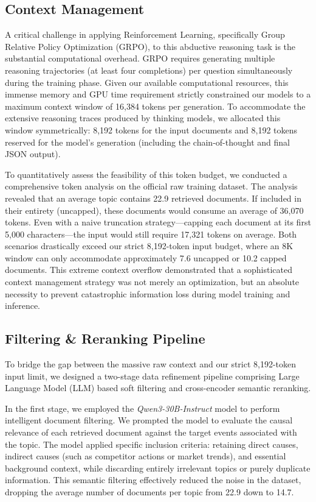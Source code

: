 \documentclass{article}
\begin{document}
\subsection{Context Management}

A critical challenge in applying Reinforcement Learning, specifically Group Relative Policy Optimization (GRPO), to this abductive reasoning task is the substantial computational overhead. GRPO requires generating multiple reasoning trajectories (at least four completions) per question simultaneously during the training phase. Given our available computational resources, this immense memory and GPU time requirement strictly constrained our models to a maximum context window of 16,384 tokens per generation. To accommodate the extensive reasoning traces produced by thinking models, we allocated this window symmetrically: 8,192 tokens for the input documents and 8,192 tokens reserved for the model's generation (including the chain-of-thought and final JSON output).

To quantitatively assess the feasibility of this token budget, we conducted a comprehensive token analysis on the official raw training dataset. The analysis revealed that an average topic contains 22.9 retrieved documents. If included in their entirety (uncapped), these documents would consume an average of 36,070 tokens. Even with a naive truncation strategy—capping each document at its first 5,000 characters—the input would still require 17,321 tokens on average. Both scenarios drastically exceed our strict 8,192-token input budget, where an 8K window can only accommodate approximately 7.6 uncapped or 10.2 capped documents. This extreme context overflow demonstrated that a sophisticated context management strategy was not merely an optimization, but an absolute necessity to prevent catastrophic information loss during model training and inference.

\subsection{Filtering \& Reranking Pipeline}

To bridge the gap between the massive raw context and our strict 8,192-token input limit, we designed a two-stage data refinement pipeline comprising Large Language Model (LLM) based soft filtering and cross-encoder semantic reranking.

In the first stage, we employed the \textit{Qwen3-30B-Instruct} model to perform intelligent document filtering. We prompted the model to evaluate the causal relevance of each retrieved document against the target events associated with the topic. The model applied specific inclusion criteria: retaining direct causes, indirect causes (such as competitor actions or market trends), and essential background context, while discarding entirely irrelevant topics or purely duplicate information. This semantic filtering effectively reduced the noise in the dataset, dropping the average number of documents per topic from 22.9 down to 14.7.
\end{document}
